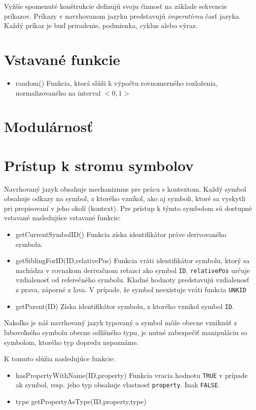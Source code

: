 Vyžšie spomenuté konštrukcie definujú svoju činnosť na základe sekvencie príkazov. Príkazy v navrhovanom jazyku predstavujú \textit{imperatívnu} časť jazyka.
Každý príkaz je buď priradenie, podmienka, cyklus alebo výraz.

\section{Vstavané funkcie}

\begin{itemize}
\item random()
	Funkcia, ktorá slúži k výpočtu rovnomerného rozloženia, normalizovaného na interval $<0,1>$
\end{itemize}
\section{Modulárnosť}
\section{Prístup k stromu symbolov}

Navrhovaný jazyk obsahuje mechanizmus pre prácu s kontextom. Každý symbol obsahuje odkazy na symbol, z ktorého vznikol, ako aj symboli, ktoré sa vyskytli
pri prepisovaní v jeho okolí (kontext). Pre prístup k týmto symbolom sú dostupné vstavané nasledujúce vstavané funkcie:

\begin{itemize}
\item getCurrentSymbolID()
	Funkcia získa identifikátor práve derivovaného symbolu.
\item getSiblingForID(ID,relativePos)
	Funkcia vráti identifikátor symbolu, ktorý sa nachádza v rovnakom derivačnom reťazci ako symbol \texttt{ID}. \texttt{relativePos} určuje vzdialenosť
	od referečného symbolu. Kladné hodnoty predstavujú vzdialenosť z prava, záporné z ľava. 
	V prípade, že symbol neexistuje vráti funkcia \texttt{UNKID}
\item getParent(ID)
	Získa identifikátor symbolu, z ktorého vznikol symbol \texttt{ID}.
\end{itemize}

Nakoľko je náš navrhovaný jazyk typovaný a symbol môže obecne vzniknúť z ľubovoľného symbolu obecne odlišného typu, je nutné zabezpečiť manipuláciu so
symbolom, ktorého typ dopredu nepoznáme.

K tomuto slúžia nasledujúce funkcie:
\begin{itemize}
\item hasPropertyWithName(ID,property)
	Funkcia vracia hodnotu \texttt{TRUE} v prípade ak symbol, resp. jeho typ obsahuje vlastnosť \texttt{property}. Inak \texttt{FALSE}.
\item type getPropertyAsType(ID,property,type)

\end{itemize}

